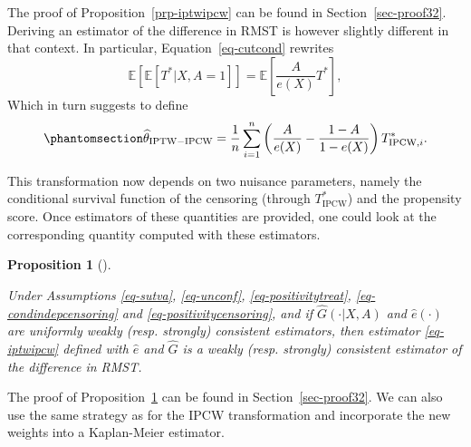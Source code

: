 \documentclass[
  11pt,
  a4paper,
]{article}
\theoremstyle{plain}
\theoremstyle{plain}
\theoremstyle{plain}
\newtheorem{proposition}{Proposition}[section]
\theoremstyle{definition}
\theoremstyle{remark}
\begin{document}
The proof of Proposition~\ref{prp-iptwipcw} can be found in
Section~\ref{sec-proof32}. Deriving an estimator of the difference in
RMST is however slightly different in that context. In particular,
Equation~\ref{eq-cutcond} rewrites \[
\mathbb{E}[\mathbb{E}[T^*|X,A=1]] = \mathbb{E}\left[\frac{A}{e(X)} T^*\right],
\] Which in turn suggests to define
\begin{equation}\phantomsection\label{eq-iptwipcw}{
\widehat\theta_{\mathrm{IPTW-IPCW}} = \frac1n\sum_{i=1}^n  \left(\frac{A}{e(X)}-\frac{1-A}{1-e(X)} \right) T^*_{\mathrm{IPCW},i}.
}\end{equation}

This transformation now depends on two nuisance parameters, namely the
conditional survival function of the censoring (through
\(T^*_{\mathrm{IPCW}}\)) and the propensity score. Once estimators of
these quantities are provided, one could look at the corresponding
quantity computed with these estimators.

\begin{proposition}[]\protect\hypertarget{prp-consiptwipcw}{}\label{prp-consiptwipcw}

Under Assumptions
\ref{eq-sutva}, \ref{eq-unconf}, \ref{eq-positivitytreat}, \ref{eq-condindepcensoring}
and \ref{eq-positivitycensoring}, and if \(\widehat G(\cdot|X,A)\) and
\(\widehat e (\cdot)\) are uniformly weakly (resp. strongly) consistent
estimators, then estimator \ref{eq-iptwipcw} defined with \(\widehat e\)
and \(\widehat G\) is a weakly (resp. strongly) consistent estimator of
the difference in RMST.

\end{proposition}

The proof of Proposition~\ref{prp-consiptwipcw} can be found in
Section~\ref{sec-proof32}. We can also use the same strategy as for the
IPCW transformation and incorporate the new weights into a Kaplan-Meier
estimator.
\end{document}
